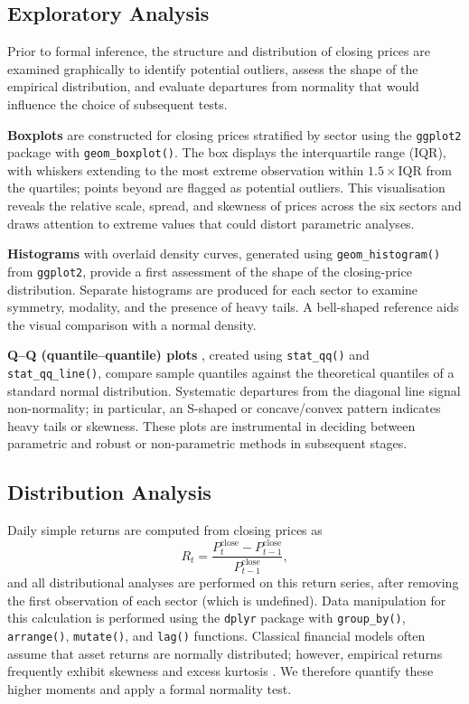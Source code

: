 \documentclass[12pt,a4paper,fleqn]{article}
\begin{document}
\subsection{Exploratory Analysis}

Prior to formal inference, the structure and distribution of closing prices are examined graphically to identify potential outliers, assess the shape of the empirical distribution, and evaluate departures from normality that would influence the choice of subsequent tests.

\textbf{Boxplots} \cite{tukey1977eda} are constructed for closing prices stratified by sector using the \texttt{ggplot2} package with \texttt{geom\_boxplot()}. The box displays the interquartile range (IQR), with whiskers extending to the most extreme observation within \(1.5\times\text{IQR}\) from the quartiles; points beyond are flagged as potential outliers. This visualisation reveals the relative scale, spread, and skewness of prices across the six sectors and draws attention to extreme values that could distort parametric analyses.

\textbf{Histograms} with overlaid density curves, generated using \texttt{geom\_histogram()} from \texttt{ggplot2}, provide a first assessment of the shape of the closing-price distribution. Separate histograms are produced for each sector to examine symmetry, modality, and the presence of heavy tails. A bell-shaped reference aids the visual comparison with a normal density.

\textbf{Q–Q (quantile–quantile) plots} \cite{chambers1983graphical}, created using \texttt{stat\_qq()} and \texttt{stat\_qq\_line()}, compare sample quantiles against the theoretical quantiles of a standard normal distribution. Systematic departures from the diagonal line signal non-normality; in particular, an S-shaped or concave/convex pattern indicates heavy tails or skewness. These plots are instrumental in deciding between parametric and robust or non-parametric methods in subsequent stages.

\subsection{Distribution Analysis}

Daily simple returns are computed from closing prices as
\[
R_t = \frac{P_t^{\text{close}} - P_{t-1}^{\text{close}}}{P_{t-1}^{\text{close}}},
\]
and all distributional analyses are performed on this return series, after removing the first observation of each sector (which is undefined). Data manipulation for this calculation is performed using the \texttt{dplyr} package with \texttt{group\_by()}, \texttt{arrange()}, \texttt{mutate()}, and \texttt{lag()} functions. Classical financial models often assume that asset returns are normally distributed; however, empirical returns frequently exhibit skewness and excess kurtosis \cite{cont2001empirical}. We therefore quantify these higher moments and apply a formal normality test.
\end{document}
